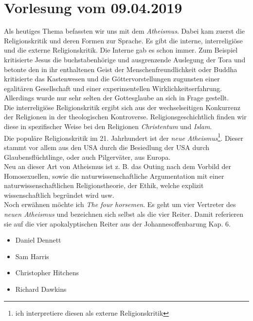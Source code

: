 \section{Vorlesung vom 09.04.2019}
Als heutiges Thema befassten wir uns mit dem \textit{Atheismus}. Dabei kam zuerst die Religionskritik und deren Formen zur Sprache. Es gibt die interne, interreligiöse und die externe Religionskritik. Die Interne gab es schon immer. Zum Beispiel kritisierte Jesus die buchstabenhörige und ausgrenzende Auslegung der Tora und betonte den in ihr enthaltenen Geist der Menschenfreundlichkeit oder Buddha kritisierte das Kastenwesen und die Göttervorstellungen zugunsten einer egalitären Gesellschaft und einer experimentellen Wirklichkeitserfahrung. Allerdings wurde nur sehr selten der Gottesglaube an sich in Frage gestellt.\\

Die interreligiöse Religionskritik ergibt sich aus der wechselseitigen Konkurrenz der Religionen in der theologischen Kontroverse. Religionsgeschichtlich finden wir diese in spezifischer Weise bei den Religionen \textit{Christentum} und \textit{Islam}. \\

Die populäre Religionskritik im 21. Jahrhundert ist der \textit{neue Atheismus}\footnote{ich interpretiere diesen als externe Religionskritik}. Dieser stammt vor allem aus den USA durch die Besiedlung der USA durch Glaubensflüchtlinge, oder auch Pilgerväter, aus Europa. \\

Neu an dieser Art von Atheismus ist z. B. das Outing nach dem Vorbild der Homosexuellen, sowie die naturwissenschaftliche Argumentation mit einer naturwissenschaftlichen Religionstheorie, der Ethik, welche explizit wissenschaftlich begründet wird usw.\\

Noch erwähnen möchte ich \glqq \textit{The four horsemen}\grqq. Es geht um vier Vertreter des \textit{neuen Atheismus} und bezeichnen sich selbst als die vier Reiter. Damit referieren sie auf die vier apokalyptischen Reiter aus der Johannesoffenbarung Kap. 6.\\

\begin{itemize}
	\item Daniel Dennett\\
	\item Sam Harris\\
	\item Christopher Hitchens\\
	\item Richard Dawkins\\
\end{itemize}


